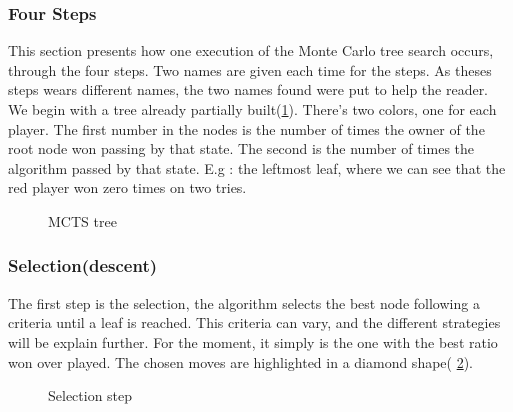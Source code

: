 \subsubsection{Four Steps}
This section presents how one execution of the Monte Carlo tree search occurs, through the four steps. Two names are given each time for the steps. As theses steps wears different names, the two names found were put to help the reader. We begin with a tree already partially built(\ref{Tree}). There's two colors, one for each player. The first number in the nodes is the number of times the owner of the root node won passing by that state. The second is the number of times the algorithm passed by that state. E.g : the leftmost leaf, where we can see that the red player won zero times on two tries. 
\begin{figure}
\begin{center}
\end{center}
\caption{MCTS tree}
\label{Tree}
\end{figure}
\subsubsection{Selection(descent)}
The first step is the selection, the algorithm selects the best node following a criteria until a leaf is reached. This criteria can vary, and the different strategies will be explain further. For the moment, it simply is the one with the best ratio won over played. The chosen moves are highlighted in a diamond shape( \ref{Selec}). 
\begin{figure}
\begin{center}
\end{center}
\caption{Selection step}
\label{Selec}
\end{figure}
